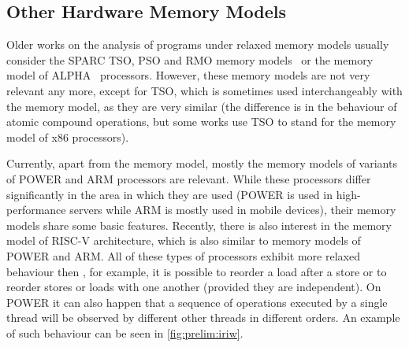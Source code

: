 \subsection{Other Hardware Memory Models}

Older works on the analysis of programs under relaxed memory models usually
consider the SPARC TSO, PSO and RMO memory models~ or the memory
model of ALPHA~ processors.
However, these memory models are not very relevant any more, except for TSO, which is sometimes used interchangeably with the \xtso memory model, as
they are very similar (the difference is in the behaviour of atomic compound
operations, but some works use TSO to stand for the memory model of x86 processors).

Currently, apart from the \xtso memory model, mostly the memory models of
variants of POWER and ARM processors are relevant.
While these processors differ significantly in the area in which they are used
(POWER is used in high-performance servers while ARM is mostly used in mobile
devices), their memory models share some basic features.
Recently, there is also interest in the memory model of RISC-V architecture, which is also similar to memory models of POWER and ARM.
All of these types of processors exhibit more relaxed behaviour then \xtso,
for example, it is possible to reorder a load after a store or to reorder
stores or loads with one another (provided they are independent).
On POWER it can also happen that a sequence of operations executed by a single thread will be observed by different other threads in different orders.
An example of such behaviour can be seen in \autoref{fig:prelim:iriw}.

